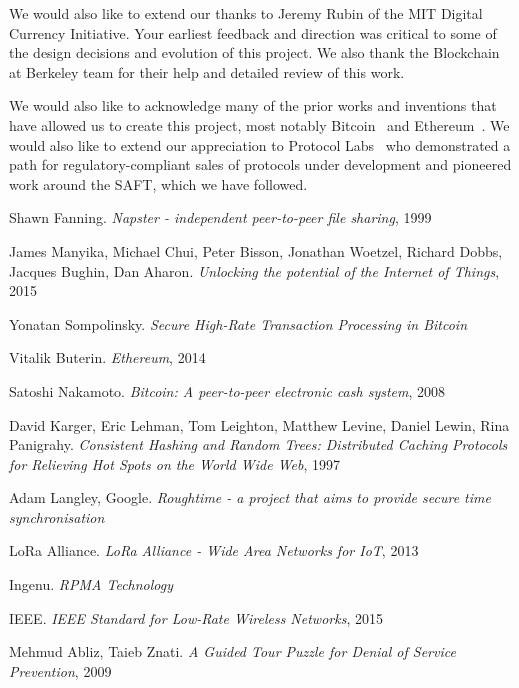 \documentclass[10pt, nonatbib, nocopyrightspace, reprint]{sigplanconf}
\begin{document}
We would also like to extend our thanks to Jeremy Rubin of the MIT Digital Currency Initiative. Your earliest feedback and direction was critical to some of the design decisions and evolution of this project. We also thank the Blockchain at Berkeley team for their help and detailed review of this work.

We would also like to acknowledge many of the prior works and inventions that have allowed us to create this project, most notably Bitcoin~\cite{bitcoin} and Ethereum~\cite{ethereum}. We would also like to extend our appreciation to Protocol Labs~\cite{protocol} who demonstrated a path for regulatory-compliant sales of protocols under development and pioneered work around the SAFT, which we have followed.
\newpage

\begin{thebibliography}{10}
\softraggedright

    Shawn Fanning. 
    \emph{Napster - independent peer-to-peer file sharing}, 1999

    James Manyika, Michael Chui, Peter Bisson, Jonathan Woetzel, Richard Dobbs, Jacques Bughin, Dan Aharon. 
    \emph{Unlocking the potential of the Internet of Things}, 2015

    Yonatan Sompolinsky. 
    \emph{Secure High-Rate Transaction Processing in Bitcoin}

    Vitalik Buterin. 
    \emph{Ethereum}, 2014

    Satoshi Nakamoto. 
    \emph{Bitcoin: A peer-to-peer electronic cash system}, 2008

    David Karger, Eric Lehman, Tom Leighton, Matthew Levine, Daniel Lewin, Rina Panigrahy. 
    \emph{Consistent Hashing and Random Trees: Distributed Caching Protocols for Relieving Hot Spots on the World Wide Web}, 1997

    Adam Langley, Google. 
    \emph{Roughtime - a project that aims to provide secure time synchronisation}

    LoRa Alliance. 
    \emph{LoRa Alliance - Wide Area Networks for IoT}, 2013

    Ingenu. 
    \emph{RPMA Technology}

    IEEE. 
    \emph{IEEE Standard for Low-Rate Wireless Networks}, 2015

    Mehmud Abliz, Taieb Znati. 
    \emph{A Guided Tour Puzzle for Denial of Service Prevention}, 2009


\end{thebibliography}
\end{document}
